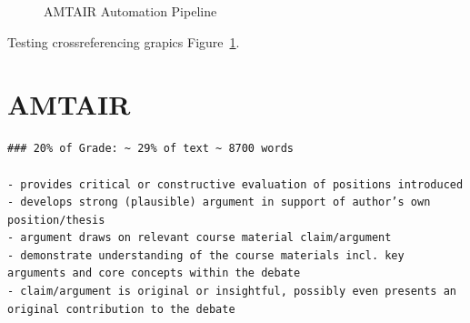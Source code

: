 \documentclass[
  letterpaper,
]{book}
\begin{document}
\begin{figure}


\caption[Five-step AMTAIR automation pipeline from PDFs to Bayesian
networks]{\label{fig-automation_pipeline}AMTAIR Automation Pipeline}

\end{figure}%

Testing crossreferencing grapics Figure~\ref{fig-automation_pipeline}.


\chapter{AMTAIR}\label{amtair}

\begin{verbatim}
### 20% of Grade: ~ 29% of text ~ 8700 words

- provides critical or constructive evaluation of positions introduced
- develops strong (plausible) argument in support of author’s own position/thesis
- argument draws on relevant course material claim/argument
- demonstrate understanding of the course materials incl. key arguments and core concepts within the debate
- claim/argument is original or insightful, possibly even presents an original contribution to the debate 
\end{verbatim}
\end{document}
